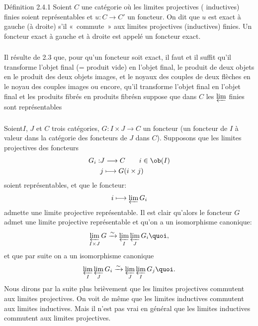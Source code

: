 \begin{enonce*}{Définition 2.4.1}
Soient $C$ une catégorie où les limites projectives (\resp
inductives) finies soient représentables et $u:C\rightarrow C'$ un
foncteur. On dit que $u$ est exact à gauche (\resp  à droite) s'il
« commute » aux limites projectives (\resp  inductives) finies.
Un foncteur exact à gauche et à droite est appelé un foncteur exact.
\end{enonce*}

\setcounter{subsection}{4} \setcounter{subsubsection}{1}
\subsubsection{}
Il résulte de 2.3 que, pour qu'un foncteur soit exact, il faut et il %
suffit qu'il transforme l'objet final (= produit vide) en l'objet
final, le produit de deux objets en le produit des deux objets
images, et le noyaux des couples de deux flèches en le noyau des
couples images ou encore, qu'il transforme l'objet final en l'objet
final et les produits fibrés en produits fibrésn
suppose que dans $C$ les $\varprojlim$ finies sont
représentables

\setcounter{subsection}{5} \setcounter{subsubsection}{-1}
\subsubsection{}
Soient\pageoriginale $I$, $J$ et $C$ trois catégories, $G:I\times
J\rightarrow C$ un foncteur (\ie un foncteur de $I$ à valeur dans la
catégorie des foncteurs de $J$ dans $C$). Supposons que les limites
projectives des foncteurs
\begin{align*}
G_i:&J\longrightarrow C\qquad i\in \ob(I)\\
    & j\longmapsto G(i\times j)
\end{align*}
soient représentables, et que le foncteur:
$$
i\longmapsto \varprojlim G_i
$$
admette une limite projective représentable. Il est clair qu'alors
le foncteur $G$ admet une limite projective représentable et qu'on a
un isomorphisme canonique:
$$
\varprojlim_{I\times J} G\\
\xrightarrow{\sim}\varprojlim_I \varprojlim_J G_i{\quoi},
$$
et que par suite on a un isomorphisme canonique
$$
\varprojlim_I \varprojlim_J G_i\xrightarrow{\sim}\varprojlim_J
\varprojlim_I G_j{\quoi}.
$$
Nous dirons par la suite plus brièvement que les limites projectives
commutent aux limites projectives. On voit de même que les limites
inductives commutent aux limites inductives. Mais il n'est pas vrai
en général que les limites inductives commutent aux limites
projectives.

